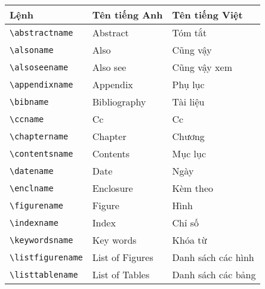 \documentclass[12pt,a4paper]{article}
\renewcommand{\contentsname}{Nội dung}
\begin{document}
\begin{itemize}
\begin{itemize}
                \begin{table}[ht]
                  \begin{center}
                    \begin{tabular}{lll}
                      \toprule
                      \textbf{Lệnh}              & \textbf{Tên tiếng Anh} & \textbf{Tên tiếng Việt} \\ \midrule
                      \verb|\abstractname|       & Abstract               & Tóm tắt                 \\ \midrule
                      \verb|\alsoname|           & Also                   & Cũng vậy                \\ \midrule
                      \verb|\alsoseename|        & Also see               & Cũng vậy xem            \\ \midrule
                      \verb|\appendixname|       & Appendix               & Phụ lục                 \\ \midrule
                      \verb|\bibname|            & Bibliography           & Tài liệu                \\ \midrule
                      \verb|\ccname|             & Cc                     & Cc                      \\ \midrule
                      \verb|\chaptername|        & Chapter                & Chương                  \\ \midrule
                      \verb|\contentsname|       & Contents               & Mục lục                 \\ \midrule
                      \verb|\datename|           & Date                   & Ngày                    \\ \midrule
                      \verb|\enclname|           & Enclosure              & Kèm theo                \\ \midrule
                      \verb|\figurename|         & Figure                 & Hình                    \\ \midrule
                      \verb|\indexname|          & Index                  & Chỉ số                  \\ \midrule
                      \verb|\keywordsname|       & Key words              & Khóa từ                 \\ \midrule
                      \verb|\listfigurename|     & List of Figures        & Danh sách các hình      \\ \midrule
                      \verb|\listtablename|      & List of Tables         & Danh sách các bảng      \\ \midrule

\end{tabular}
\end{center}
\end{table}
\end{itemize}
\end{itemize}
\end{document}
